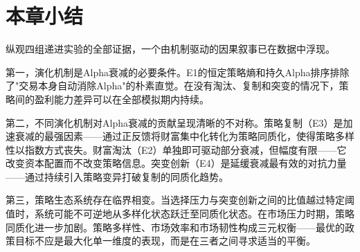 \section{本章小结}

纵观四组递进实验的全部证据，一个由机制驱动的因果叙事已在数据中浮现。

第一，演化机制是Alpha衰减的必要条件。E1的恒定策略熵和持久Alpha排序排除了"交易本身自动消除Alpha"的朴素直觉。在没有淘汰、复制和突变的情况下，策略间的盈利能力差异可以在全部模拟期内持续。

第二，不同演化机制对Alpha衰减的贡献呈现清晰的不对称。策略复制（E3）是加速衰减的最强因素——通过正反馈将财富集中化转化为策略同质化，使得策略多样性以指数方式丧失。财富淘汰（E2）单独即可驱动部分衰减，但幅度有限——它改变资本配置而不改变策略信息。突变创新（E4）是延缓衰减最有效的对抗力量——通过持续引入策略变异打破复制的同质化趋势。

第三，策略生态系统存在临界相变。当选择压力与突变创新之间的比值越过特定阈值时，系统可能不可逆地从多样化状态跃迁至同质化状态。在市场压力时期，策略同质化进一步加剧。策略多样性、市场效率和市场韧性构成三元权衡——最优的政策目标不应是最大化单一维度的表现，而是在三者之间寻求适当的平衡。

